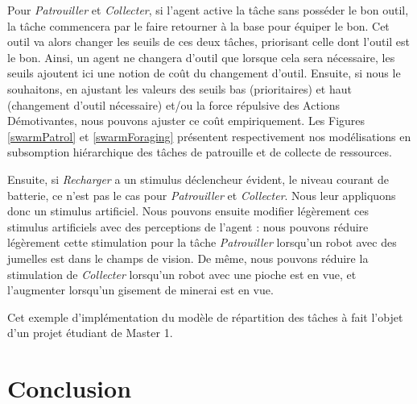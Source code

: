 		Pour \textit{Patrouiller} et \textit{Collecter}, si l'agent active la tâche sans posséder le bon outil, la tâche commencera par le faire retourner à la base pour équiper le bon. Cet outil va alors changer les seuils de ces deux tâches, priorisant celle dont l'outil est le bon. Ainsi, un agent ne changera d'outil que lorsque cela sera nécessaire, les seuils ajoutent ici une notion de coût du changement d'outil. Ensuite, si nous le souhaitons, en ajustant les valeurs des seuils bas (prioritaires) et haut (changement d'outil nécessaire) et/ou la force répulsive des Actions Démotivantes, nous pouvons ajuster ce coût empiriquement. Les Figures \ref{swarmPatrol} et \ref{swarmForaging} présentent respectivement nos modélisations en subsomption hiérarchique des tâches de patrouille et de collecte de ressources. 
		
		Ensuite, si \textit{Recharger} a un stimulus déclencheur évident, le niveau courant de batterie, ce n'est pas le cas pour \textit{Patrouiller} et \textit{Collecter}. Nous leur appliquons donc un stimulus artificiel. Nous pouvons ensuite modifier légèrement ces stimulus artificiels avec des perceptions de l'agent : nous pouvons réduire légèrement cette stimulation pour la tâche \textit{Patrouiller} lorsqu'un robot avec des jumelles est dans le champs de vision. De même, nous pouvons réduire la stimulation de \textit{Collecter} lorsqu'un robot avec une pioche est en vue, et l'augmenter lorsqu'un gisement de minerai est en vue.
		
		Cet exemple d'implémentation du modèle de répartition des tâches à fait l'objet d'un projet étudiant de Master 1.
			
			
				
	\section*{Conclusion}
